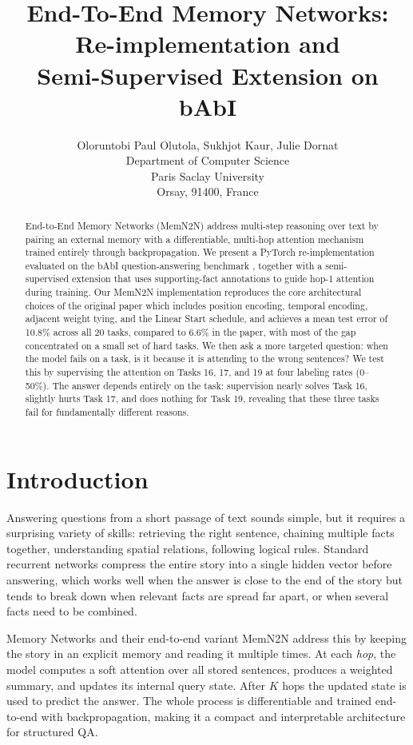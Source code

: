\documentclass{article} %
\title{End-To-End Memory Networks: Re-implementation and\\Semi-Supervised Extension on bAbI}
\author{Oloruntobi Paul Olutola, Sukhjot Kaur, Julie Dornat \\
Department of Computer Science\\
Paris Saclay University\\
Orsay, 91400, France
}
\begin{document}
\maketitle

\begin{abstract}
End-to-End Memory Networks (MemN2N) \citep{sukhbaatar2015end} address multi-step reasoning over text by pairing an external memory with a differentiable, multi-hop attention mechanism trained entirely through backpropagation. We present a PyTorch re-implementation evaluated on the bAbI question-answering benchmark \citep{weston2015towards}, together with a semi-supervised extension that uses supporting-fact annotations to guide hop-1 attention during training. Our MemN2N implementation reproduces the core architectural choices of the original paper which includes position encoding, temporal encoding, adjacent weight tying, and the Linear Start schedule, and achieves a mean test error of 10.8\% across all 20 tasks, compared to 6.6\% in the paper, with most of the gap concentrated on a small set of hard tasks. We then ask a more targeted question: when the model fails on a task, is it because it is attending to the wrong sentences? We test this by supervising the attention on Tasks 16, 17, and 19 at four labeling rates (0--50\%). The answer depends entirely on the task: supervision nearly solves Task 16, slightly hurts Task 17, and does nothing for Task 19, revealing that these three tasks fail for fundamentally different reasons.
\end{abstract}

\section{Introduction}
\label{sec:intro}

Answering questions from a short passage of text sounds simple, but it requires a surprising variety of skills: retrieving the right sentence, chaining multiple facts together, understanding spatial relations, following logical rules. Standard recurrent networks \citep{hochreiter1997long} compress the entire story into a single hidden vector before answering, which works well when the answer is close to the end of the story but tends to break down when relevant facts are spread far apart, or when several facts need to be combined.

Memory Networks \citep{weston2014memory} and their end-to-end variant MemN2N \citep{sukhbaatar2015end} address this by keeping the story in an explicit memory and reading it multiple times. At each \emph{hop}, the model computes a soft attention over all stored sentences, produces a weighted summary, and updates its internal query state. After $K$ hops the updated state is used to predict the answer. The whole process is differentiable and trained end-to-end with backpropagation, making it a compact and interpretable architecture for structured QA.
\end{document}
